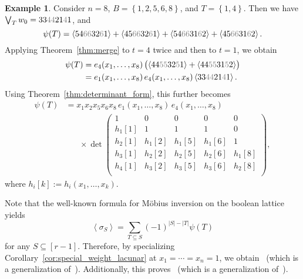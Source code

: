 \documentclass[reqno]{amsart}
\newcommand{\0}{\phantom{c}}
\newcommand{\swt}[1]{\left\langle #1 \right\rangle} %
\let\sumnonlimits\sum
\renewcommand{\sum}{\sumnonlimits\limits}
\newcommand{\set}[1]{\left\{ #1 \right\}}
\newcommand{\ive}[1]{\left[ #1 \right]}
\theoremstyle{plain}
\theoremstyle{definition}
\newtheorem{example}[thm]{Example}
\numberwithin{equation}{section}
\begin{document}
\begin{example}
Consider $n = 8$, $B = \set{1,2,5,6,8}$, and $T = \set{1,4}$.
Then we have $\bigvee_T w_0 = 33{\color{gray}44}21{\color{gray}4}1$, and
\[
\psi(T) = \swt{54{\color{gray}66}32{\color{gray}6}1} + \swt{45{\color{gray}66}32{\color{gray}6}1} + \swt{54{\color{gray}66}31{\color{gray}6}2} + \swt{45{\color{gray}66}31{\color{gray}6}2}.
\]
Applying Theorem~\ref{thm:merge} to $t = 4$ twice and then to $t=1$, we obtain
\begin{align*}
\psi(T) & = e_4(x_1, \dotsc, x_8) \, \bigl( \swt{44{\color{gray}55}32{\color{gray}5}1} + \swt{44{\color{gray}55}31{\color{gray}5}2} \bigr)
\\ & = e_1(x_1, \dotsc, x_8) \, e_4(x_1, \dotsc, x_8) \swt{33{\color{gray}44}21{\color{gray}4}1}.
\end{align*}
Using Theorem~\ref{thm:determinant_form}, this further becomes
\begin{align*}
\psi(T) & = x_1 x_2 x_5 x_6 x_8 \, e_1(x_1, \dotsc, x_8) \, e_4(x_1, \dotsc, x_8)
\\ & \hspace{20pt} \times \det \begin{pmatrix}
1 & 0 & 0 & 0 & 0 \\
h_1[1] & 1 & 1 & 1 & 0 \\
h_2[1] & h_1[2] & h_1[5] & h_1[6] & 1 \\
h_3[1] & h_2[2] & h_2[5] & h_2[6] & h_1[8] \\
h_4[1] & h_3[2] & h_3[5] & h_3[6] & h_2[8] \\
\end{pmatrix},
\end{align*}
where $h_i[k] := h_i(x_1, \dotsc, x_k)$.
\end{example}

Note that the well-known formula for M\"obius inversion on the boolean lattice yields
\[
\swt{\sigma_S} = \sum_{T\subseteq S} (-1)^{|S|-|T|} \psi(T)
\]
for any $S \subseteq \ive{r-1}$.
Therefore, by specializing Corollary~\ref{cor:special_weight_lacunar} at $x_1 = \cdots = x_n = 1$, we obtain~\cite[Conj.~3.10]{AasLin17} (which is a generalization of~\cite[Conj.~3.9]{AasLin17}).
Additionally, this proves~\cite[Conj.~3.6]{AasLin17} (which is a generalization of~\cite[Conj.~3.4]{AasLin17}).










\end{document}
